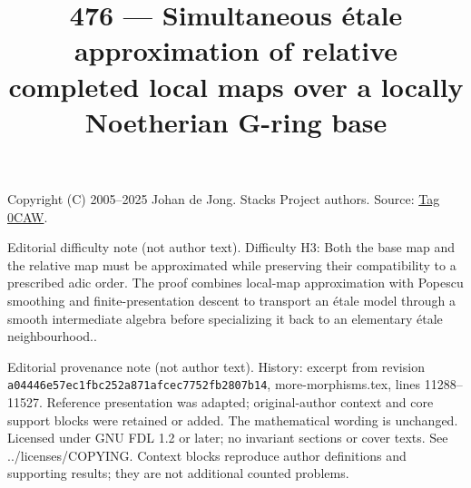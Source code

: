 \documentclass{amsart}
\theoremstyle{plain}
\theoremstyle{definition}
\theoremstyle{remark}
\numberwithin{equation}{subsection}
\begin{document}
\title[Stacks Project, Tag 0CAW]{476 --- Simultaneous étale approximation of relative completed local maps over a locally Noetherian G-ring base}
\maketitle
\noindent Copyright (C) 2005--2025 Johan de Jong. Stacks Project authors. Source: \href{https://stacks.math.columbia.edu/tag/0CAW}{Tag 0CAW}.

\noindent Editorial difficulty note (not author text). Difficulty H3: Both the base map and the relative map must be approximated while preserving their compatibility to a prescribed adic order. The proof combines local-map approximation with Popescu smoothing and finite-presentation descent to transport an étale model through a smooth intermediate algebra before specializing it back to an elementary étale neighbourhood..

\noindent Editorial provenance note (not author text). History: excerpt from revision \texttt{a0444\allowbreak 6e57e\allowbreak c1fbc\allowbreak 252a8\allowbreak 71afc\allowbreak ec775\allowbreak 2fb28\allowbreak 07b14}, more-morphisms.tex, lines 11288--11527. Reference presentation was adapted; original-author context and core support blocks were retained or added. The mathematical wording is unchanged. Licensed under GNU FDL 1.2 or later; no invariant sections or cover texts. See ../licenses/COPYING. Context blocks reproduce author definitions and supporting results; they are not additional counted problems.
\end{document}
